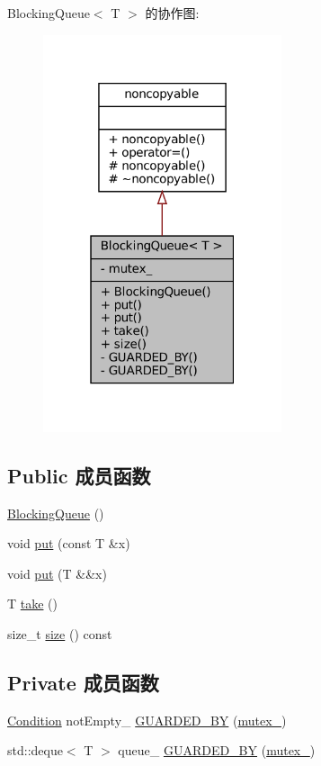 Blocking\+Queue$<$ T $>$ 的协作图\+:
\nopagebreak
\begin{figure}[H]
\begin{center}
\leavevmode
\includegraphics[width=199pt]{classmuduo_1_1BlockingQueue__coll__graph}
\end{center}
\end{figure}
\subsection*{Public 成员函数}
\begin{DoxyCompactItemize}
\item 
\hyperlink{classmuduo_1_1BlockingQueue_ad639c03895ae86de2f4e6cda0c2d3a71}{Blocking\+Queue} ()
\item 
void \hyperlink{classmuduo_1_1BlockingQueue_a9b315be92f51608e0d347f1fe77b8e3f}{put} (const T \&x)
\item 
void \hyperlink{classmuduo_1_1BlockingQueue_ae3d9a92b70266faafd1600ba3442607d}{put} (T \&\&x)
\item 
T \hyperlink{classmuduo_1_1BlockingQueue_a926c690dfed431d9d806584f3d996e07}{take} ()
\item 
size\+\_\+t \hyperlink{classmuduo_1_1BlockingQueue_a259cb5a711406a8c3e5d937eb9350cca}{size} () const
\end{DoxyCompactItemize}
\subsection*{Private 成员函数}
\begin{DoxyCompactItemize}
\item 
\hyperlink{classmuduo_1_1Condition}{Condition} not\+Empty\+\_\+ \hyperlink{classmuduo_1_1BlockingQueue_adc809585805fc6f065fa7414c29ab2af}{G\+U\+A\+R\+D\+E\+D\+\_\+\+BY} (\hyperlink{classmuduo_1_1BlockingQueue_a6e1bf1809a42f40f1a21178dc6620a6f}{mutex\+\_\+})
\item 
std\+::deque$<$ T $>$ queue\+\_\+ \hyperlink{classmuduo_1_1BlockingQueue_acad94d46306e0fa11e88613d5bfd7976}{G\+U\+A\+R\+D\+E\+D\+\_\+\+BY} (\hyperlink{classmuduo_1_1BlockingQueue_a6e1bf1809a42f40f1a21178dc6620a6f}{mutex\+\_\+})
\end{DoxyCompactItemize}
